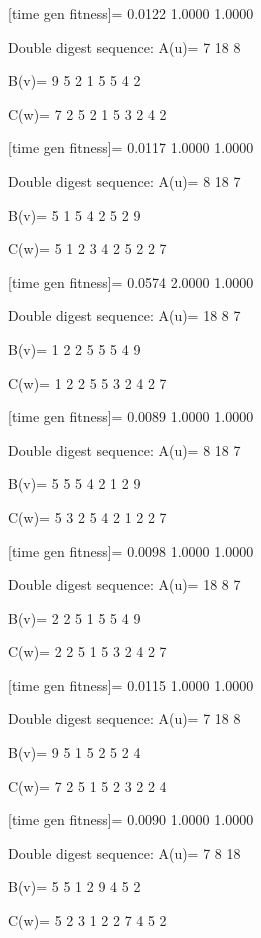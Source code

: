 [time gen fitness]=
    0.0122    1.0000    1.0000

Double digest sequence:
A(u)=
     7    18     8

B(v)=
     9     5     2     1     5     5     4     2

C(w)=
     7     2     5     2     1     5     3     2     4     2

[time gen fitness]=
    0.0117    1.0000    1.0000

Double digest sequence:
A(u)=
     8    18     7

B(v)=
     5     1     5     4     2     5     2     9

C(w)=
     5     1     2     3     4     2     5     2     2     7

[time gen fitness]=
    0.0574    2.0000    1.0000

Double digest sequence:
A(u)=
    18     8     7

B(v)=
     1     2     2     5     5     5     4     9

C(w)=
     1     2     2     5     5     3     2     4     2     7

[time gen fitness]=
    0.0089    1.0000    1.0000

Double digest sequence:
A(u)=
     8    18     7

B(v)=
     5     5     5     4     2     1     2     9

C(w)=
     5     3     2     5     4     2     1     2     2     7

[time gen fitness]=
    0.0098    1.0000    1.0000

Double digest sequence:
A(u)=
    18     8     7

B(v)=
     2     2     5     1     5     5     4     9

C(w)=
     2     2     5     1     5     3     2     4     2     7

[time gen fitness]=
    0.0115    1.0000    1.0000

Double digest sequence:
A(u)=
     7    18     8

B(v)=
     9     5     1     5     2     5     2     4

C(w)=
     7     2     5     1     5     2     3     2     2     4

[time gen fitness]=
    0.0090    1.0000    1.0000

Double digest sequence:
A(u)=
     7     8    18

B(v)=
     5     5     1     2     9     4     5     2

C(w)=
     5     2     3     1     2     2     7     4     5     2


